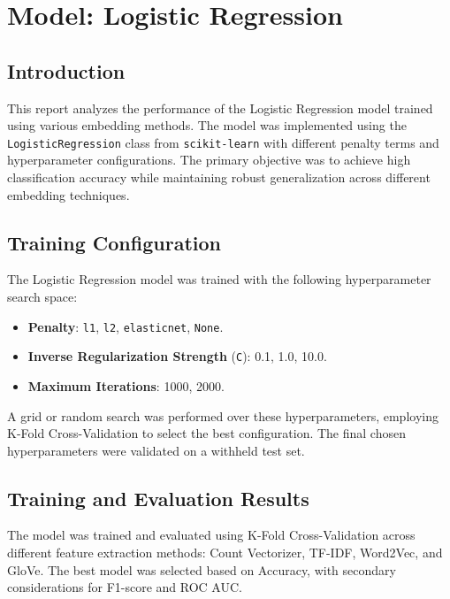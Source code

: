 \section{Model: Logistic Regression}

\subsection{Introduction}
This report analyzes the performance of the Logistic Regression model trained using various embedding methods. The model was implemented using the \texttt{LogisticRegression} class from \texttt{scikit-learn} with different penalty terms and hyperparameter configurations. The primary objective was to achieve high classification accuracy while maintaining robust generalization across different embedding techniques.

\subsection{Training Configuration}
The Logistic Regression model was trained with the following hyperparameter search space:
\begin{itemize}
    \item \textbf{Penalty}: \texttt{l1}, \texttt{l2}, \texttt{elasticnet}, \texttt{None}.
    \item \textbf{Inverse Regularization Strength} (\texttt{C}): 0.1, 1.0, 10.0.
    \item \textbf{Maximum Iterations}: 1000, 2000.
\end{itemize}


A grid or random search was performed over these hyperparameters, employing K-Fold Cross-Validation to select the best configuration. The final chosen hyperparameters were validated on a withheld test set.

\subsection{Training and Evaluation Results}
The model was trained and evaluated using K-Fold Cross-Validation across different feature extraction methods: Count Vectorizer, TF-IDF, Word2Vec, and GloVe. The best model was selected based on Accuracy, with secondary considerations for F1-score and ROC AUC.

